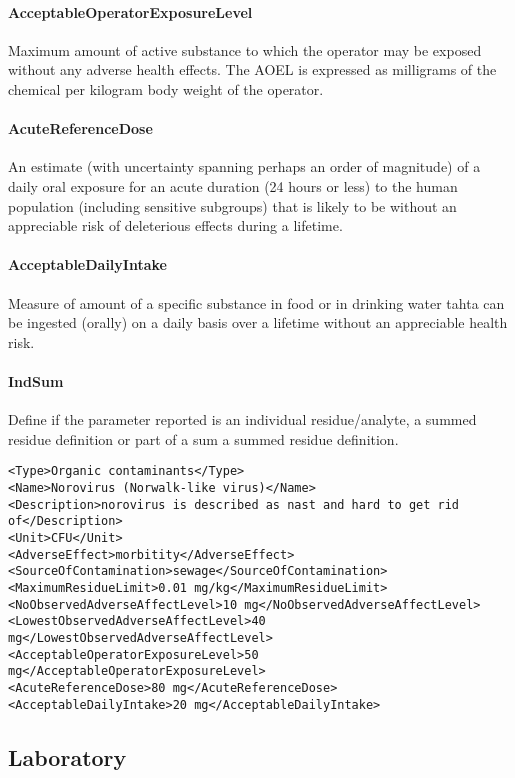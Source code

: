 \documentclass[a4paper]{report}
\begin{document}
\paragraph{AcceptableOperatorExposureLevel}
Maximum amount of active substance to which the operator may be exposed without any adverse health effects. The AOEL is expressed as milligrams of the chemical per kilogram body weight of the operator.

\paragraph{AcuteReferenceDose}
An estimate (with uncertainty spanning perhaps an order of magnitude) of a daily oral exposure for an acute duration (24 hours or less) to the human population (including sensitive subgroups) that is likely to be without an appreciable risk of deleterious effects during a lifetime.

\paragraph{AcceptableDailyIntake}
Measure of amount of a specific substance in food or in drinking water tahta can be ingested (orally) on a daily basis over a lifetime without an appreciable health risk.

\paragraph{IndSum}
Define if the parameter reported is an individual residue/analyte, a summed residue definition or part of a sum a summed residue definition.

\begin{lstlisting}[language=RAKIP, caption={Example of Hazard}]
<Type>Organic contaminants</Type>
<Name>Norovirus (Norwalk-like virus)</Name>
<Description>norovirus is described as nast and hard to get rid
of</Description>
<Unit>CFU</Unit>
<AdverseEffect>morbitity</AdverseEffect>
<SourceOfContamination>sewage</SourceOfContamination>
<MaximumResidueLimit>0.01 mg/kg</MaximumResidueLimit>
<NoObservedAdverseAffectLevel>10 mg</NoObservedAdverseAffectLevel>
<LowestObservedAdverseAffectLevel>40 mg</LowestObservedAdverseAffectLevel>
<AcceptableOperatorExposureLevel>50 mg</AcceptableOperatorExposureLevel>
<AcuteReferenceDose>80 mg</AcuteReferenceDose>
<AcceptableDailyIntake>20 mg</AcceptableDailyIntake>
\end{lstlisting}

\subsection{Laboratory}
\end{document}
